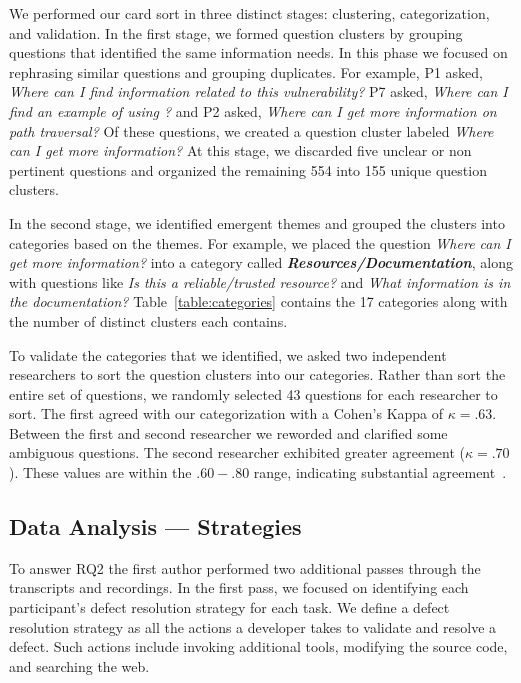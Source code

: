 \documentclass[10pt,journal,compsoc]{IEEEtran}
\begin{document}
We performed our card sort in three distinct stages: clustering, categorization, and validation.
In the first stage, we formed question clusters by grouping questions that identified the same information needs. 
In this phase we focused on rephrasing similar questions and grouping duplicates.
For example, P1 asked, \textit{Where can I find information related to this vulnerability?} P7 asked, \textit{Where can I find an example of using ?} and P2 asked, \textit{Where can I get more information on path traversal?} 
Of these questions, we created a question cluster labeled \textit{Where can I get more information?}
At this stage, we discarded five unclear or non pertinent questions and organized the remaining 554 into 155 unique question clusters.

In the second stage, we identified emergent themes and grouped the clusters into categories based on the themes. 
For example, we placed the question \textit{Where can I get more information?} into a category called \emph{\textbf{Resources/Documentation}}, along with questions like \textit{Is this a reliable/trusted resource?} and \textit{What information is in the documentation?} 
Table~\ref{table:categories} contains the 17 categories along with the number of distinct clusters each contains. 

To validate the categories that we identified, we asked two independent researchers to sort the question clusters into our categories. 
Rather than sort the entire set of questions, we randomly selected 43 questions for each researcher to sort.
The first agreed with our categorization with a Cohen's Kappa of $\kappa = .63$. 
Between the first and second researcher we reworded and clarified some ambiguous questions. The second researcher exhibited greater agreement ($\kappa = .70$). 
These values are within the $.60 - .80$ range, indicating substantial agreement~\cite{Landis1977agreement}.

\subsection{Data Analysis --- Strategies}
\label{sec:strategyAnalysis}
To answer RQ2 the first author performed two additional passes through the transcripts and recordings. 
In the first pass, we focused on identifying each participant's defect resolution strategy for each task. 
We define a defect resolution strategy as all the actions a developer takes to validate and resolve a defect. 
Such actions include invoking additional tools, modifying the source code, and searching the web.
\end{document}
